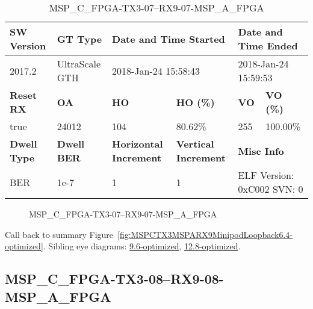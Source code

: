 \begin{table}[h]
\centering
\caption{MSP\_C\_FPGA-TX3-07--RX9-07-MSP\_A\_FPGA}
\label{tab:MSPCFPGATX307RX907MSPAFPGA6.4-optimized}
\begin{tabular}{@{}|l|l|l|l|l|l|@{}}
\toprule
\textbf{SW Version}                & \textbf{GT Type}   & \multicolumn{2}{l|}{\textbf{Date and Time Started}}            & \multicolumn{2}{l|}{\textbf{Date and Time Ended}}        \\ \midrule
2017.2                       & UltraScale GTH          & \multicolumn{2}{l|}{2018-Jan-24 15:58:43}                   & \multicolumn{2}{l|}{2018-Jan-24 15:59:53}               \\ \midrule
\textbf{Reset RX}                  & \textbf{OA} & \textbf{HO}   & \textbf{HO (\%)} & \textbf{VO} & \textbf{VO (\%)} \\ \midrule
true & 24012        & 104          & 80.62\%        & 255        & 100.00\%       \\ \midrule
\textbf{Dwell Type}                & \textbf{Dwell BER} & \textbf{Horizontal Increment} & \textbf{Vertical Increment}    & \multicolumn{2}{l|}{\textbf{Misc Info}}                  \\ \midrule
BER                            & 1e-7        & 1        & 1           & \multicolumn{2}{l|}{ELF Version: 0xC002 SVN: 0}                         \\ \bottomrule
\end{tabular}
\end{table}

\begin{figure}[h]
\caption{MSP\_C\_FPGA-TX3-07--RX9-07-MSP\_A\_FPGA} \label{fig:MSPCFPGATX307RX907MSPAFPGA6.4-optimized}
\end{figure}

Call back to summary Figure~\ref{fig:MSPCTX3MSPARX9MinipodLoopback6.4-optimized}.
Sibling eye diagrams: \hyperref[sec:MSPCFPGATX307RX907MSPAFPGA9.6-optimized]{9.6-optimized}, \hyperref[sec:MSPCFPGATX307RX907MSPAFPGA12.8-optimized]{12.8-optimized}.

\clearpage
\newpage


\subsection{MSP\_C\_FPGA-TX3-08--RX9-08-MSP\_A\_FPGA}\label{sec:MSPCFPGATX308RX908MSPAFPGA6.4-optimized}

